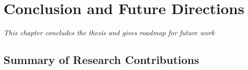 \chapter{Conclusion and Future Directions}
\label{chap10}
\textit{This chapter concludes the thesis and gives roadmap for future work}
\vspace{2ex}\vfill
\minitoc
\newpage
\section{Summary of Research Contributions}


\label{sec:FRET}


